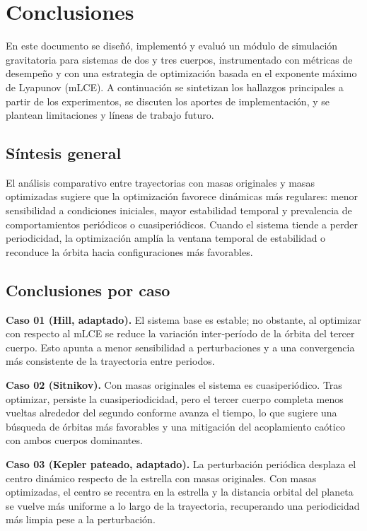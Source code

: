 \chapter{Conclusiones}
\label{chap:conclusiones}

En este documento se diseñó, implementó y evaluó un módulo de simulación gravitatoria para sistemas de dos y tres cuerpos, instrumentado con métricas de desempeño y con una estrategia de optimización basada en el exponente máximo de Lyapunov (mLCE). A continuación se sintetizan los hallazgos principales a partir de los experimentos, se discuten los aportes de implementación, y se plantean limitaciones y líneas de trabajo futuro.

\section{Síntesis general}
El análisis comparativo entre trayectorias con masas originales y masas optimizadas sugiere que la optimización favorece dinámicas más regulares: menor sensibilidad a condiciones iniciales, mayor estabilidad temporal y prevalencia de comportamientos periódicos o cuasiperiódicos. Cuando el sistema tiende a perder periodicidad, la optimización amplía la ventana temporal de estabilidad o reconduce la órbita hacia configuraciones más favorables.

\section{Conclusiones por caso}
\textbf{Caso 01 (Hill, adaptado).} El sistema base es estable; no obstante, al optimizar con respecto al mLCE se reduce la variación inter‑período de la órbita del tercer cuerpo. Esto apunta a menor sensibilidad a perturbaciones y a una convergencia más consistente de la trayectoria entre periodos.

\textbf{Caso 02 (Sitnikov).} Con masas originales el sistema es cuasiperiódico. Tras optimizar, persiste la cuasiperiodicidad, pero el tercer cuerpo completa menos vueltas alrededor del segundo conforme avanza el tiempo, lo que sugiere una búsqueda de órbitas más favorables y una mitigación del acoplamiento caótico con ambos cuerpos dominantes.

\textbf{Caso 03 (Kepler pateado, adaptado).} La perturbación periódica desplaza el centro dinámico respecto de la estrella con masas originales. Con masas optimizadas, el centro se recentra en la estrella y la distancia orbital del planeta se vuelve más uniforme a lo largo de la trayectoria, recuperando una periodicidad más limpia pese a la perturbación.

